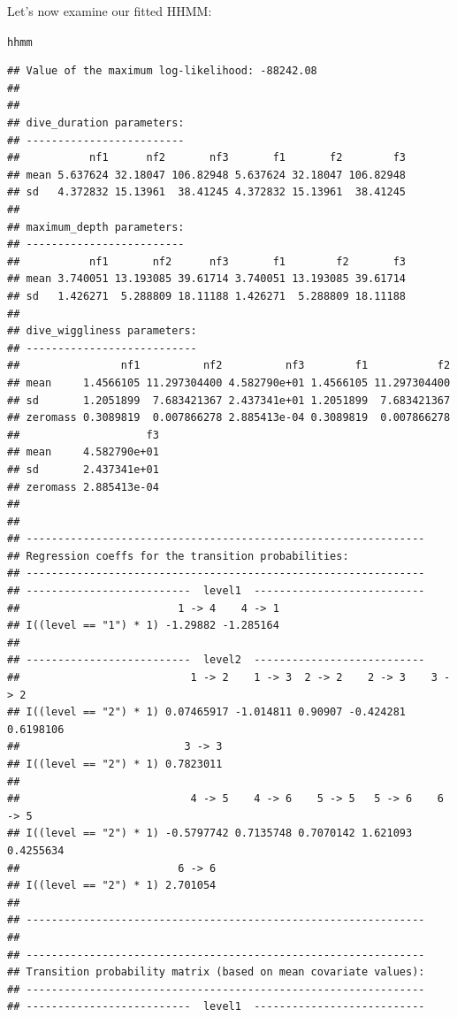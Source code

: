 \documentclass[12pt]{article}\usepackage[]{graphicx}\usepackage[]{color}
\makeatletter
\newcommand{\hlstd}[1]{\textcolor[rgb]{0.345,0.345,0.345}{#1}}%
\newenvironment{kframe}{%
 \def\at@end@of@kframe{}%
 \ifinner\ifhmode%
  \def\at@end@of@kframe{\end{minipage}}%
  \begin{minipage}{\columnwidth}%
 \fi\fi%
 \def\FrameCommand##1{\hskip\@totalleftmargin \hskip-\fboxsep
 \colorbox{shadecolor}{##1}\hskip-\fboxsep
     \hskip-\linewidth \hskip-\@totalleftmargin \hskip\columnwidth}%
 \MakeFramed {\advance\hsize-\width
   \@totalleftmargin\z@ \linewidth\hsize
   \@setminipage}}%
 {\par\unskip\endMakeFramed%
 \at@end@of@kframe}
\newenvironment{knitrout}{}{} %
\makeatother
\begin{document}
Let's now examine our fitted HHMM:
\begin{knitrout}
\color{fgcolor}\begin{kframe}
\begin{alltt}
\hlstd{hhmm}
\end{alltt}
\begin{verbatim}
## Value of the maximum log-likelihood: -88242.08 
## 
## 
## dive_duration parameters:
## -------------------------
##           nf1      nf2       nf3       f1       f2        f3
## mean 5.637624 32.18047 106.82948 5.637624 32.18047 106.82948
## sd   4.372832 15.13961  38.41245 4.372832 15.13961  38.41245
## 
## maximum_depth parameters:
## -------------------------
##           nf1       nf2      nf3       f1        f2       f3
## mean 3.740051 13.193085 39.61714 3.740051 13.193085 39.61714
## sd   1.426271  5.288809 18.11188 1.426271  5.288809 18.11188
## 
## dive_wiggliness parameters:
## ---------------------------
##                nf1          nf2          nf3        f1           f2
## mean     1.4566105 11.297304400 4.582790e+01 1.4566105 11.297304400
## sd       1.2051899  7.683421367 2.437341e+01 1.2051899  7.683421367
## zeromass 0.3089819  0.007866278 2.885413e-04 0.3089819  0.007866278
##                    f3
## mean     4.582790e+01
## sd       2.437341e+01
## zeromass 2.885413e-04
## 
## 
## ---------------------------------------------------------------
## Regression coeffs for the transition probabilities:
## ---------------------------------------------------------------
## --------------------------  level1  ---------------------------
##                         1 -> 4    4 -> 1
## I((level == "1") * 1) -1.29882 -1.285164
## 
## --------------------------  level2  ---------------------------
##                           1 -> 2    1 -> 3  2 -> 2    2 -> 3    3 -> 2
## I((level == "2") * 1) 0.07465917 -1.014811 0.90907 -0.424281 0.6198106
##                          3 -> 3
## I((level == "2") * 1) 0.7823011
## 
##                           4 -> 5    4 -> 6    5 -> 5   5 -> 6    6 -> 5
## I((level == "2") * 1) -0.5797742 0.7135748 0.7070142 1.621093 0.4255634
##                         6 -> 6
## I((level == "2") * 1) 2.701054
## 
## ---------------------------------------------------------------
## 
## ---------------------------------------------------------------
## Transition probability matrix (based on mean covariate values):
## ---------------------------------------------------------------
## --------------------------  level1  ---------------------------

\end{verbatim}
\end{kframe}
\end{knitrout}
\end{document}
